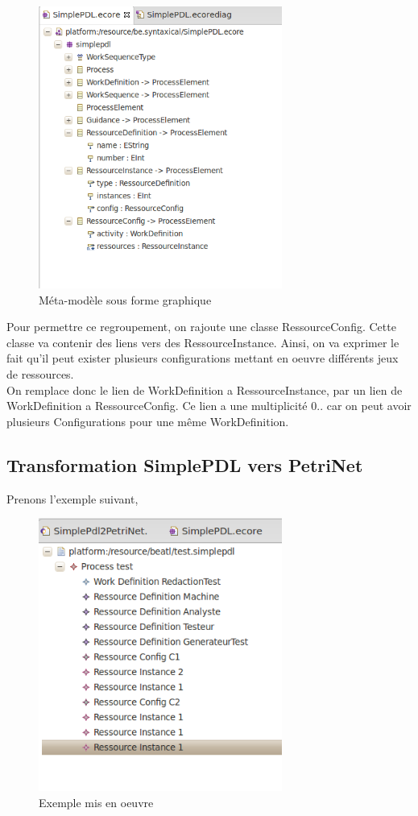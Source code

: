 \begin{figure}[!h] 
\begin{center}
\includegraphics[width=8cm]{Capture-14.png}
\caption{Méta-modèle sous forme graphique} 
\label{img1} 
\end{center}
\end{figure} 

Pour permettre ce regroupement, on rajoute une classe RessourceConfig. Cette classe va contenir des liens vers des RessourceInstance. Ainsi, on va exprimer le fait qu'il peut exister plusieurs configurations mettant en oeuvre différents jeux de ressources.\\

On remplace donc le lien de WorkDefinition a RessourceInstance, par un lien de WorkDefinition a RessourceConfig. Ce lien a une multiplicité 0..\* car on peut avoir plusieurs Configurations pour une même WorkDefinition.

\subsection{Transformation SimplePDL vers PetriNet}

Prenons l'exemple suivant, 

\begin{figure}[!h] 
\begin{center}
\includegraphics[width=8cm]{Capture-15.png}
\caption{Exemple mis en oeuvre} 
\label{img1} 
\end{center}
\end{figure}

